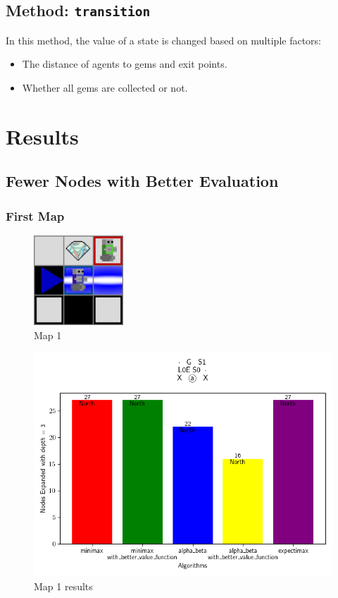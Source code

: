 \documentclass{article}
\begin{document}
\subsection{Method: \texttt{transition}}
In this method, the value of a state is changed based on multiple factors:
\begin{itemize}
    \item The distance of agents to gems and exit points.
    \item Whether all gems are collected or not.
\end{itemize}

\newpage
\section{Results}
\subsection{Fewer Nodes with Better Evaluation}
\subsubsection{First Map}

\begin{figure}
    \centering
    \includegraphics[width=0.3\textwidth]{media/map/map2023_10_29_13_48_15.png}
    \caption{Map 1}
    \label{fig:image1}
\end{figure}

\begin{figure}[h]
    \centering
    \includegraphics[width=\textwidth]{media/map2023_10_29_13_48_15.png}
    \caption{Map 1 results}
    \label{fig:image1}
\end{figure}
\vspace{1em}
\end{document}
